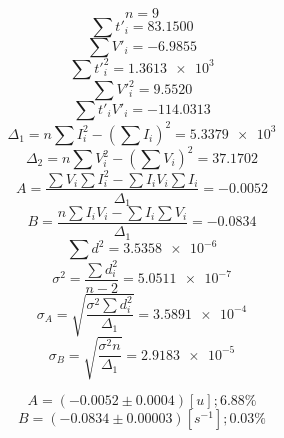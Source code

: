 \documentclass[letter,11pt]{article}
\begin{document}
\begin{equation*}
    n = 9
\end{equation*}
\begin{equation*}
    \sum t'_i = 83.1500
\end{equation*}
\begin{equation*}
    \sum V'_i = -6.9855
\end{equation*}
\begin{equation*}
    \sum t'^2_i = \num{1.3613e3}
\end{equation*}
\begin{equation*}
    \sum V'^2_i = 9.5520
\end{equation*}
\begin{equation*}
    \sum t'_i V'_i = -114.0313
\end{equation*}
\begin{equation*}
    \Delta_1 = n \sum I^2_i - \left( \sum I_i \right)^2 = \num{5.3379e3}
\end{equation*}
\begin{equation*}
    \Delta_2 = n \sum V^2_i - \left( \sum V_i \right)^2 = 37.1702
\end{equation*}
\begin{equation*}
    A = \frac{\sum V_i \sum I^2_i - \sum I_i V_i \sum I_i}{\Delta_1} = -0.0052
\end{equation*}
\begin{equation*}
    B = \frac{n \sum I_i V_i - \sum I_i \sum V_i}{\Delta_1} = -0.0834
\end{equation*}
\begin{equation*}
    \sum d^2 = \num{3.5358e-6}
\end{equation*}
\begin{equation*}
    \sigma^2 = \frac{\sum d^2_i}{n-2} = \num{5.0511e-7}
\end{equation*}
\begin{equation*}
    \sigma_A = \sqrt{\frac{\sigma^2 \sum d^2_i}{\Delta_1}} = \num{3.5891e-4}
\end{equation*}
\begin{equation*}
    \sigma_B = \sqrt{\frac{\sigma^2 n}{\Delta_1}} = \num{2.9183e-5}
\end{equation*}

\begin{equation*}
    A = (-0.0052 \pm 0.0004)[u]; 6.88 \%
\end{equation*}
\begin{equation*}
    B = (-0.0834 \pm 0.00003)[s^{-1}]; 0.03 \%
\end{equation*}
\end{document}
